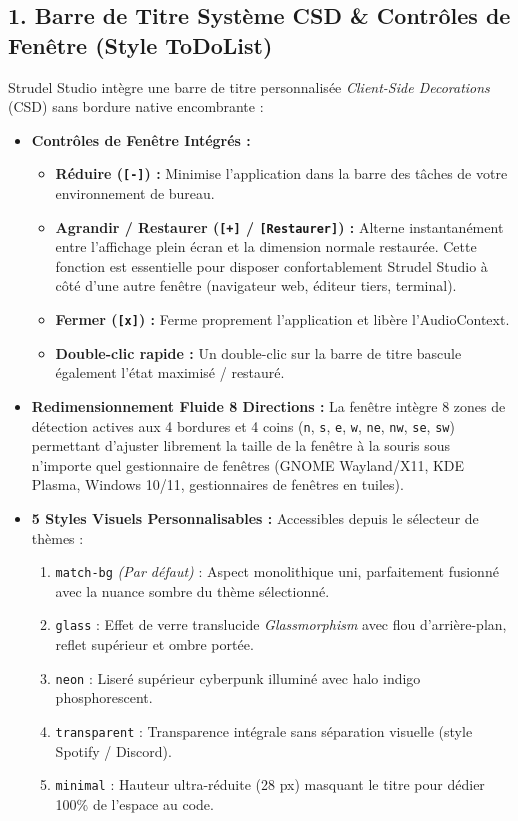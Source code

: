 \documentclass[a4paper,10pt]{article}
\begin{document}
\subsection{1. Barre de Titre Système CSD \& Contrôles de Fenêtre (Style ToDoList)}
Strudel Studio intègre une barre de titre personnalisée \textit{Client-Side Decorations} (CSD) sans bordure native encombrante :
\begin{itemize}
    \item \textbf{Contrôles de Fenêtre Intégrés :}
    \begin{itemize}
        \item \textbf{Réduire (\texttt{[-]}) :} Minimise l'application dans la barre des tâches de votre environnement de bureau.
        \item \textbf{Agrandir / Restaurer (\texttt{[+]} / \texttt{[Restaurer]}) :} Alterne instantanément entre l'affichage plein écran et la dimension normale restaurée. Cette fonction est essentielle pour disposer confortablement Strudel Studio à côté d'une autre fenêtre (navigateur web, éditeur tiers, terminal).
        \item \textbf{Fermer (\texttt{[x]}) :} Ferme proprement l'application et libère l'AudioContext.
        \item \textbf{Double-clic rapide :} Un double-clic sur la barre de titre bascule également l'état maximisé / restauré.
    \end{itemize}
    \item \textbf{Redimensionnement Fluide 8 Directions :} La fenêtre intègre 8 zones de détection actives aux 4 bordures et 4 coins (\texttt{n}, \texttt{s}, \texttt{e}, \texttt{w}, \texttt{ne}, \texttt{nw}, \texttt{se}, \texttt{sw}) permettant d'ajuster librement la taille de la fenêtre à la souris sous n'importe quel gestionnaire de fenêtres (GNOME Wayland/X11, KDE Plasma, Windows 10/11, gestionnaires de fenêtres en tuiles).
    \item \textbf{5 Styles Visuels Personnalisables :} Accessibles depuis le sélecteur de thèmes :
    \begin{enumerate}
        \item \texttt{match-bg} \textit{(Par défaut)} : Aspect monolithique uni, parfaitement fusionné avec la nuance sombre du thème sélectionné.
        \item \texttt{glass} : Effet de verre translucide \textit{Glassmorphism} avec flou d'arrière-plan, reflet supérieur et ombre portée.
        \item \texttt{neon} : Liseré supérieur cyberpunk illuminé avec halo indigo phosphorescent.
        \item \texttt{transparent} : Transparence intégrale sans séparation visuelle (style Spotify / Discord).
        \item \texttt{minimal} : Hauteur ultra-réduite (28 px) masquant le titre pour dédier 100\% de l'espace au code.
    \end{enumerate}
\end{itemize}
\end{document}
